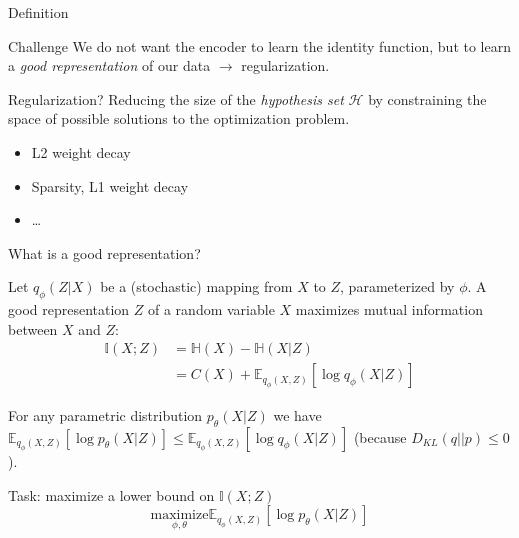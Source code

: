 \documentclass{beamer}
\begin{document}
  \begin{frame}{Definition}


    \begin{alertblock}{Challenge}
      We do not want the encoder to learn the identity function, but to learn a \emph{good representation} of our data $\rightarrow$ regularization.
    \end{alertblock}

    \vspace{0.5cm}

    \begin{block}{Regularization?}
      Reducing the size of the \emph{hypothesis set} $\mathcal{H}$ by constraining the space of possible solutions to the optimization problem.
      \vspace{-0.4cm}
      \begin{itemize}
        \item L2 weight decay
        \item Sparsity, L1 weight decay
        \item \dots
      \end{itemize}
    \end{block}
    
  \end{frame}

  \begin{frame}{What is a good representation?}

    
    \small{Let $q_{\phi}(Z|X)$ be a (stochastic) mapping from $X$ to $Z$, parameterized by $\phi$. A good representation $Z$ of a random variable $X$ maximizes \alert{mutual information} between $X$ and $Z$:}
    \vspace{-0.4cm}
    \begin{align*}
      \mathbb{I}(X;Z) &= \mathbb{H}(X) - \mathbb{H}(X|Z)\\
                      &= C(X) + \mathbb{E}_{q_{\phi}(X,Z)}\left[\log q_{\phi}(X|Z)\right]
    \end{align*}

    \small{For any parametric distribution $p_{\theta}(X|Z)$ we have $\mathbb{E}_{q_{\phi}(X,Z)}\left[\log p_{\theta}(X|Z)\right] \leq \mathbb{E}_{q_{\phi}(X,Z)}\left[\log q_{\phi}(X|Z)\right]$ (because $D_{KL}(q||p) \leq 0$).}

    \begin{block}{Task: maximize a lower bound on $\mathbb{I}(X;Z)$}
      \begin{equation*}
        \underset{\phi,\theta}{\text{maximize}} \mathbb{E}_{q_{\phi}(X,Z)}\left[\log p_{\theta}(X|Z)\right]
      \end{equation*}
    \end{block}

  \end{frame}
\end{document}
